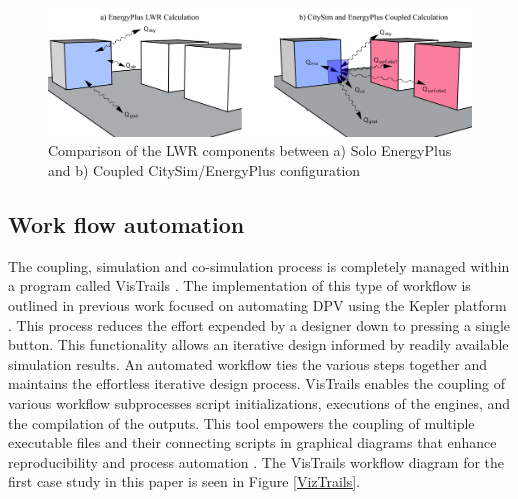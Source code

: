 \documentclass{tBPS2e}
\theoremstyle{plain}
\theoremstyle{definition}
\theoremstyle{remark}
\begin{document}
\begin{figure}[H]
  \centering
  \includegraphics[width=1.0\textwidth]{figures/LWRCalc_Combined_V3}
  \caption{Comparison of the LWR components between a) Solo EnergyPlus and b) Coupled CitySim/EnergyPlus configuration \citep{miller_long_2015}
  \label{combinedLWR}}
\end{figure}

\subsection{Work flow automation}
The coupling, simulation and co-simulation process is completely managed
within a program called VisTrails \citep{freire_reproducibility_2014}. The
implementation of this type of workflow is outlined in previous work focused
on automating DPV using the Kepler platform \citep{thomas_customizable_2012}. This
process reduces the effort expended by a designer down to pressing a single
button. This functionality allows an iterative design informed by
readily available simulation results. An automated workflow ties the
various steps together and maintains the effortless iterative design process.
VisTrails enables the coupling of various workflow subprocesses script
initializations, executions of the engines, and the compilation of the
outputs. This tool empowers the coupling of multiple executable files and their
connecting scripts in graphical diagrams that enhance reproducibility and
process automation \citep{freire_reproducibility_2014}. The VisTrails workflow diagram for
the first case study in this paper is seen in Figure \ref{VizTrails}.
\end{document}
